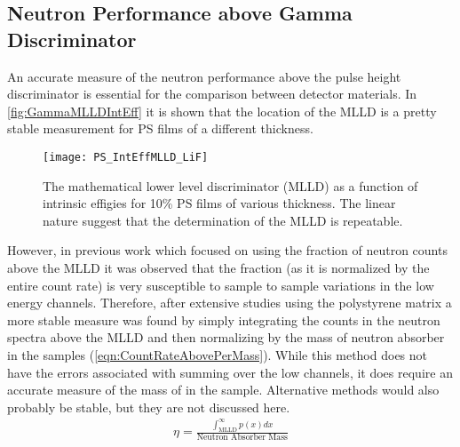 \documentclass[onecolumn]{IEEEtran}
\begin{document}
\subsection{Neutron Performance above Gamma Discriminator}
An accurate measure of the neutron performance above the pulse height discriminator is essential for the comparison between detector materials.
In \autoref{fig:GammaMLLDIntEff} it is shown that the location of the MLLD is a pretty stable measurement for PS films of a different thickness.
\begin{figure}
  \centering
  \texttt{[image: PS\_IntEffMLLD\_LiF]}
  \caption[Stability of Lower Level Discriminator]{The mathematical lower level discriminator (MLLD) as a function of intrinsic effigies for 10\% PS films of various thickness. The linear nature suggest that the determination of the MLLD is repeatable.}
  \label{fig:GammaMLLDIntEff}
\end{figure}
However, in previous work which focused on using the fraction of neutron counts above the MLLD it was observed that the fraction (as it is normalized by the entire count rate) is very susceptible to sample to sample variations in the low energy channels.
Therefore, after extensive studies using the polystyrene matrix a more stable measure was found by simply integrating the counts in the neutron spectra above the MLLD and then normalizing by the mass of neutron absorber in the samples (\autoref{eqn:CountRateAbovePerMass}).
While this method does not have the errors associated with summing over the low channels, it does require an accurate measure of the mass of  in the sample.
Alternative methods would also probably be stable, but they are not discussed here.
\begin{align}
\label{eqn:CountRateAbovePerMass}
\eta = \frac{\int_{\text{MLLD}}^\infty p(x)dx}{\text{Neutron Absorber Mass}}
\end{align}
\end{document}
